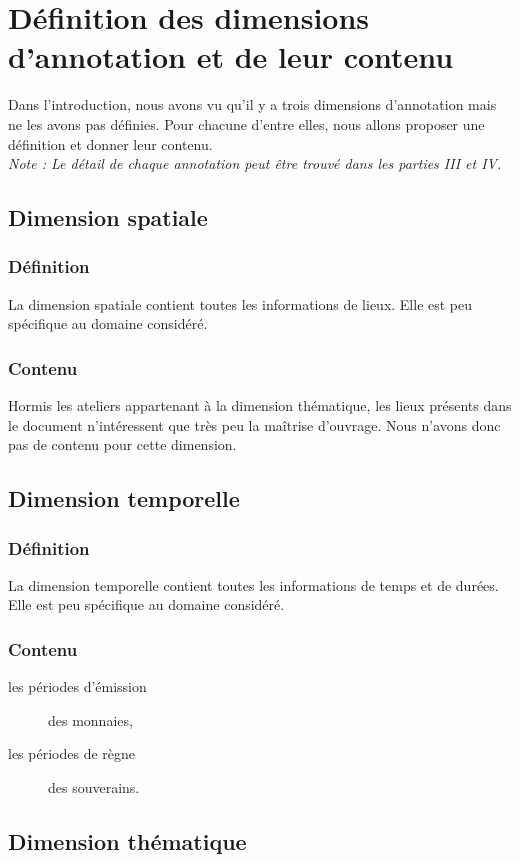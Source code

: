 \documentclass[a4paper, 11pt]{report}
\begin{document}
    \section{Définition des dimensions d'annotation et de leur contenu}
    Dans l'introduction, nous avons vu qu'il y a trois dimensions d'annotation mais ne les avons pas définies. Pour chacune d'entre elles, nous allons proposer une définition et donner leur contenu.\\
    \textit{Note : Le détail de chaque annotation peut être trouvé dans les parties III et IV.}
    \subsection{Dimension spatiale}
    \subsubsection{Définition}
     La dimension spatiale contient toutes les informations de lieux. Elle est peu spécifique au domaine considéré.
    \subsubsection{Contenu}
      Hormis les ateliers appartenant à la dimension thématique, les lieux présents dans le document n'intéressent que très peu la maîtrise d'ouvrage. Nous n'avons donc pas de contenu pour cette dimension.
    \subsection{Dimension temporelle}
        \subsubsection{Définition}
    La dimension temporelle contient toutes les informations de temps et de durées. Elle est peu spécifique au domaine considéré.
    \subsubsection{Contenu}
    \begin{description}
    \item[les périodes d'émission] des monnaies,
    \item[les périodes de règne] des souverains.
    \end{description}
    
    \subsection{Dimension thématique}
\end{document}
